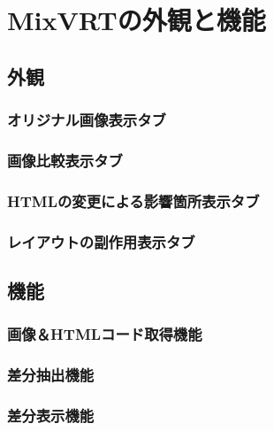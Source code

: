 \chapter{MixVRTの外観と機能}\label{cha:Function}



\section{外観}\label{sec:area_detection}
\subsection{オリジナル画像表示タブ}\label{subsec:att}
\subsection{画像比較表示タブ}\label{subsec:a}
\subsection{HTMLの変更による影響箇所表示タブ}\label{subsec:tt}
\subsection{レイアウトの副作用表示タブ}\label{subsec:at}


\section{機能}\label{sec:label_detection}
\subsection{画像＆HTMLコード取得機能}\label{subsec:a1}
\subsection{差分抽出機能}\label{sec:a2}
\subsection{差分表示機能}\label{sec:a3}